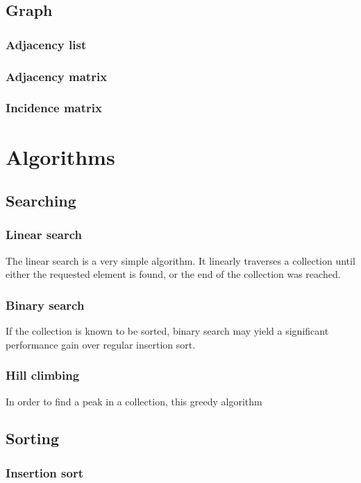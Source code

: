 \documentclass{article}
\begin{document}
\newpage

\subsection{Graph}
\subsubsection{Adjacency list}
\subsubsection{Adjacency matrix}
\subsubsection{Incidence matrix}

\newpage

\section{Algorithms}
\subsection{Searching}
\subsubsection{Linear search}
The linear search is a very simple algorithm. It linearly traverses a collection until either the requested
element is found, or the end of the collection was reached.

\subsubsection{Binary search}
If the collection is known to be sorted, binary search may yield a significant performance gain over regular insertion sort.


\subsubsection{Hill climbing}
In order to find a peak in a collection, this greedy algorithm 

\newpage

\subsection{Sorting}
\subsubsection{Insertion sort}
\end{document}
